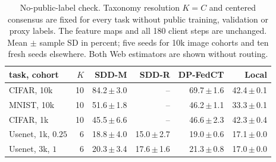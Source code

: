 \begin{table}[t]
\centering
\caption{No-public-label check. Taxonomy resolution $K=C$ and centered consensus are fixed for every task without public training, validation or proxy labels. The feature maps and all 180 client steps are unchanged. Mean $\pm$ sample SD in percent; five seeds for 10k image cohorts and ten fresh seeds elsewhere. Both Web estimators are shown without routing.}
\label{tab:label-free}
\small\setlength{\tabcolsep}{3pt}
\begin{tabular}{@{}lrrrrr@{}}\toprule
task, cohort & $K$ & SDD-M & SDD-R & DP-FedCT & Local \\\midrule
CIFAR, 10k & 10 & 84.2\,$\pm$\,3.0 & -- & 69.7\,$\pm$\,1.6 & 42.4\,$\pm$\,0.1 \\
MNIST, 10k & 10 & 51.6\,$\pm$\,1.8 & -- & 46.2\,$\pm$\,1.1 & 33.3\,$\pm$\,0.1 \\
CIFAR, 1k & 10 & 45.5\,$\pm$\,6.6 & -- & 46.6\,$\pm$\,2.3 & 42.3\,$\pm$\,0.4 \\
Usenet, 1k, $0.25$ & 6 & 18.8\,$\pm$\,4.0 & 15.0\,$\pm$\,2.7 & 19.0\,$\pm$\,0.6 & 17.1\,$\pm$\,0.0 \\
Usenet, 3k, $1$ & 6 & 20.3\,$\pm$\,3.4 & 17.6\,$\pm$\,1.6 & 21.3\,$\pm$\,0.8 & 17.0\,$\pm$\,0.0 \\
\bottomrule\end{tabular}
\end{table}
